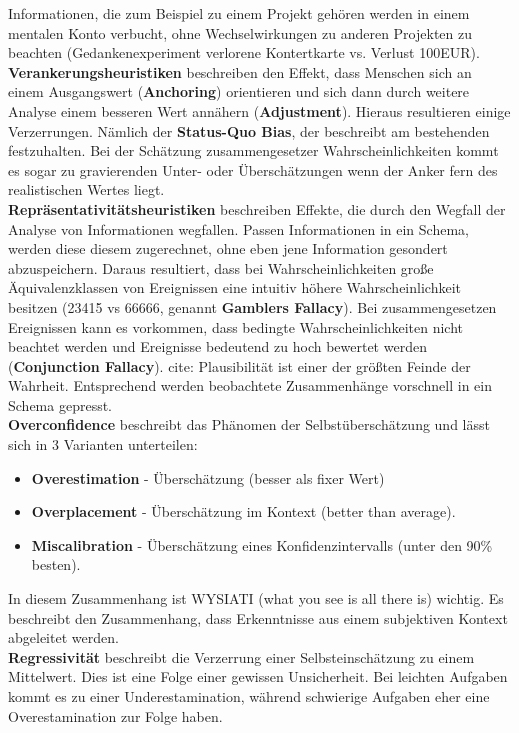 Informationen, die zum Beispiel zu einem Projekt gehören werden in
einem mentalen Konto verbucht, ohne Wechselwirkungen zu anderen Projekten
zu beachten (Gedankenexperiment verlorene Kontertkarte vs. Verlust 100EUR). \\
\textbf{Verankerungsheuristiken} beschreiben den Effekt, dass Menschen sich
an einem Ausgangswert (\textbf{Anchoring}) orientieren und sich dann durch weitere Analyse einem
besseren Wert annähern (\textbf{Adjustment}). Hieraus resultieren
einige Verzerrungen. Nämlich der \textbf{Status-Quo Bias}, der beschreibt am bestehenden
festzuhalten. Bei der Schätzung zusammengesetzer Wahrscheinlichkeiten
kommt es sogar zu gravierenden Unter- oder Überschätzungen wenn der Anker fern
des realistischen Wertes liegt. \\
\textbf{Repräsentativitätsheuristiken} beschreiben Effekte, die durch den
Wegfall der Analyse von Informationen wegfallen. Passen Informationen
in ein Schema, werden diese diesem zugerechnet, ohne eben jene Information
gesondert abzuspeichern. Daraus resultiert, dass bei Wahrscheinlichkeiten
große Äquivalenzklassen von Ereignissen eine intuitiv höhere
Wahrscheinlichkeit besitzen (23415 vs 66666, genannt \textbf{Gamblers
Fallacy}). Bei zusammengesetzen
Ereignissen kann es vorkommen, dass bedingte Wahrscheinlichkeiten nicht
beachtet werden und Ereignisse bedeutend zu hoch bewertet werden
(\textbf{Conjunction Fallacy}). cite: Plausibilität ist einer der
größten Feinde der Wahrheit. Entsprechend werden beobachtete Zusammenhänge
vorschnell in ein Schema gepresst. \\
\textbf{Overconfidence} beschreibt das Phänomen der Selbstüberschätzung
und lässt sich in 3 Varianten unterteilen:
\begin{itemize}
    \item \textbf{Overestimation} - Überschätzung (besser als fixer Wert)
    \item \textbf{Overplacement} - Überschätzung im Kontext (better than average).
    \item \textbf{Miscalibration} - Überschätzung eines Konfidenzintervalls
        (unter den 90\% besten).
\end{itemize}
In diesem Zusammenhang ist WYSIATI (what you see is all there is) wichtig.
Es beschreibt den Zusammenhang, dass Erkenntnisse aus einem subjektiven
Kontext abgeleitet werden.\\
\textbf{Regressivität} beschreibt die Verzerrung einer Selbsteinschätzung
zu einem Mittelwert. Dies ist eine Folge einer gewissen Unsicherheit.
Bei leichten Aufgaben kommt es zu einer Underestamination, während schwierige
Aufgaben eher eine Overestamination zur Folge haben.

